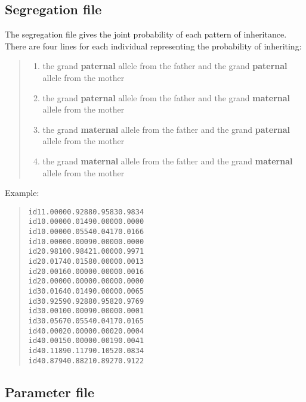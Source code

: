 \documentclass[a4paper]{article}
\begin{document}
\subsection{Segregation file%
  \label{segregation-file}%
}

The segregation file gives the joint probability of each pattern of inheritance. There are four lines for each individual representing the probability of inheriting:

\begin{quote}
\begin{enumerate}
\item the grand \textbf{paternal} allele from the father and the grand \textbf{paternal} allele from the mother

\item the grand \textbf{paternal} allele from the father and the grand \textbf{maternal} allele from the mother

\item the grand \textbf{maternal} allele from the father and the grand \textbf{paternal} allele from the mother

\item the grand \textbf{maternal} allele from the father and the grand \textbf{maternal} allele from the mother
\end{enumerate}
\end{quote}

Example:

\begin{quote}
\begin{alltt}
id1    1.0000    0.9288    0.9583    0.9834
id1    0.0000    0.0149    0.0000    0.0000
id1    0.0000    0.0554    0.0417    0.0166
id1    0.0000    0.0009    0.0000    0.0000
id2    0.9810    0.9842    1.0000    0.9971
id2    0.0174    0.0158    0.0000    0.0013
id2    0.0016    0.0000    0.0000    0.0016
id2    0.0000    0.0000    0.0000    0.0000
id3    0.0164    0.0149    0.0000    0.0065
id3    0.9259    0.9288    0.9582    0.9769
id3    0.0010    0.0009    0.0000    0.0001
id3    0.0567    0.0554    0.0417    0.0165
id4    0.0002    0.0000    0.0002    0.0004
id4    0.0015    0.0000    0.0019    0.0041
id4    0.1189    0.1179    0.1052    0.0834
id4    0.8794    0.8821    0.8927    0.9122
\end{alltt}
\end{quote}


\subsection{Parameter file%
  \label{parameter-file}%
}
\end{document}
